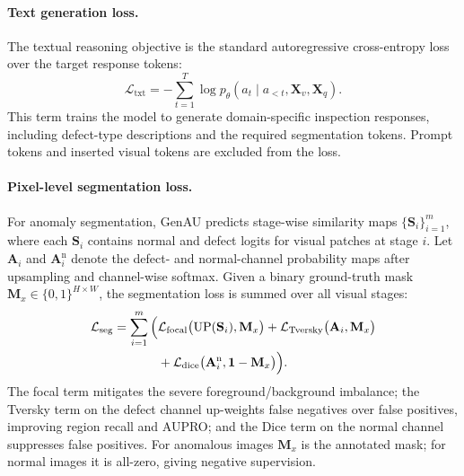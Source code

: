 \paragraph{Text generation loss.}
The textual reasoning objective is the standard autoregressive cross-entropy loss over the target response tokens:
\begin{equation}
    \mathcal{L}_{\mathrm{txt}}
    =
    -
    \sum_{t=1}^{T}
    \log
    p_{\theta}
    \left(
        a_t
        \mid
        a_{<t}, \mathbf{X}_v, \mathbf{X}_q
    \right).
    \label{eq:text-loss}
\end{equation}
This term trains the model to generate domain-specific inspection responses, including defect-type descriptions and the required segmentation tokens. Prompt tokens and inserted visual tokens are excluded from the loss.

\paragraph{Pixel-level segmentation loss.}
For anomaly segmentation, GenAU predicts stage-wise similarity maps $\{\mathbf{S}_i\}_{i=1}^{m}$, where each $\mathbf{S}_i$ contains normal and defect logits for visual patches at stage $i$. Let $\mathbf{A}_i$ and $\mathbf{A}_i^{\mathrm{n}}$ denote the defect- and normal-channel probability maps after upsampling and channel-wise softmax. Given a binary ground-truth mask $\mathbf{M}_x\in\{0,1\}^{H\times W}$, the segmentation loss is summed over all visual stages:
\begin{align}
    \mathcal{L}_{\mathrm{seg}}
    =
    \sum_{i=1}^{m}
    \Big(
        &
        \mathcal{L}_{\mathrm{focal}}
        \big(
            \mathrm{UP}(\mathbf{S}_i),
            \mathbf{M}_x
        \big)
        +
        \mathcal{L}_{\mathrm{Tversky}}
        \big(
            \mathbf{A}_i,
            \mathbf{M}_x
        \big)
        \notag \\
        &
        +
        \mathcal{L}_{\mathrm{dice}}
        \big(
            \mathbf{A}_i^{\mathrm{n}},
            \mathbf{1}-\mathbf{M}_x
        \big)
    \Big).
    \label{eq:seg-loss}
\end{align}
The focal term mitigates the severe foreground/background imbalance; the Tversky term on the defect channel up-weights false negatives over false positives, improving region recall and AUPRO; and the Dice term on the normal channel suppresses false positives. For anomalous images $\mathbf{M}_x$ is the annotated mask; for normal images it is all-zero, giving negative supervision.

